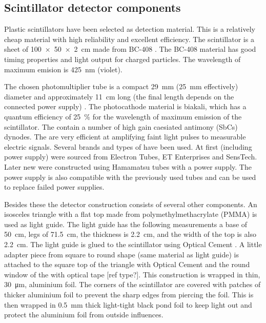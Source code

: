 \subsection{Scintillator detector components}

Plastic scintillators have been selected as detection material. This is a relatively cheap material with high reliability and excellent efficiency. The scintillator is a sheet of \SI[product-units=power]{100 x 50 x 2}{\centi\meter} made from BC-408 \cite{sgc2011bc408}. The BC-408 material has good timing properties and light output for charged particles. The wavelength of maximum emision is \SI{425}{\nano\meter} (violet).

The chosen photomultiplier tube \cite{et2010pmt} is a compact \SI{29}{\milli\meter} (\SI{25}{\milli\meter} effectively) diameter and approximately \SI{11}{\centi\meter} long (the final length depends on the connected power supply) \pmt. The photocathode material is biakali, which has a quantum efficiency of \SI{25}{\percent} for the wavelength of maximum emission of the scintillator. The \pmts contain a number of high gain caesiated antimony (SbCs) dynodes. The \pmts are very efficient at amplifying faint light pulses to measurable electric signals. Several brands and types of \pmts have been used. At first \pmts (including power supply) were sourced from Electron Tubes, ET Enterprises and SensTech. Later new \pmts were constructed using Hamamatsu tubes with a \nikhef power supply. The \nikhef \pmt power supply is also compatible with the previously used tubes and can be used to replace failed power supplies.

Besides these the detector construction consists of several other components. An isosceles triangle with a flat top made from polymethylmethacrylate (PMMA) is used as light guide. The light guide has the following measurements a base of \SI{50}{\centi\meter}, legs of \SI{71.5}{\centi\meter}, the thickness is \SI{2.2}{\centi\meter}, and the width of the top is also \SI{2.2}{\centi\meter}. The light guide is glued to the scintillator using Optical Cement \cite{sgc2014bc600}. A little adapter piece from square to round shape (same material as light guide) is attached to the square top of the triangle with Optical Cement and the round window of the \pmt with optical tape [ref type?]. This construction is wrapped in thin, \SI{30}{\micro\meter}, aluminium foil. The corners of the scintillator are covered with patches of thicker aluminium foil to prevent the sharp edges from piercing the foil. This is then wrapped in \SI{0.5}{\milli\meter} thick light-tight black pond foil to keep light out and protect the aluminium foil from outside influences.

